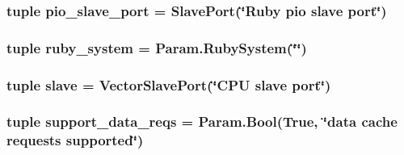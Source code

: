 \label{classSequencer_1_1RubyPort_a63d83b93705d8e98024b0cf901f52f75}
\hypertarget{classSequencer_1_1RubyPort_a82316b5d33f337f8528f5514c9a2d7ab}{
\subsubsection[{pio\_\-slave\_\-port}]{\setlength{\rightskip}{0pt plus 5cm}tuple {\bf pio\_\-slave\_\-port} = {\bf SlavePort}(\char`\"{}Ruby pio {\bf slave} port\char`\"{})}}
\label{classSequencer_1_1RubyPort_a82316b5d33f337f8528f5514c9a2d7ab}
\hypertarget{classSequencer_1_1RubyPort_ad43d9de73a55aa43ab5023d7815d7286}{
\subsubsection[{ruby\_\-system}]{\setlength{\rightskip}{0pt plus 5cm}tuple {\bf ruby\_\-system} = Param.RubySystem(\char`\"{}\char`\"{})}}
\label{classSequencer_1_1RubyPort_ad43d9de73a55aa43ab5023d7815d7286}
\hypertarget{classSequencer_1_1RubyPort_a9b8cb1f697e86858437a78f041478c9b}{
\subsubsection[{slave}]{\setlength{\rightskip}{0pt plus 5cm}tuple {\bf slave} = VectorSlavePort(\char`\"{}CPU {\bf slave} port\char`\"{})}}
\label{classSequencer_1_1RubyPort_a9b8cb1f697e86858437a78f041478c9b}
\hypertarget{classSequencer_1_1RubyPort_aa05c4974d49163b7fb2ec88b78b62739}{
\subsubsection[{support\_\-data\_\-reqs}]{\setlength{\rightskip}{0pt plus 5cm}tuple {\bf support\_\-data\_\-reqs} = Param.Bool(True, \char`\"{}data cache requests supported\char`\"{})}}

